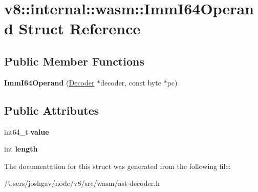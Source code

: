 \hypertarget{structv8_1_1internal_1_1wasm_1_1_imm_i64_operand}{}\section{v8\+:\+:internal\+:\+:wasm\+:\+:Imm\+I64\+Operand Struct Reference}
\label{structv8_1_1internal_1_1wasm_1_1_imm_i64_operand}
\subsection*{Public Member Functions}
\begin{DoxyCompactItemize}
\item 
{\bfseries Imm\+I64\+Operand} (\hyperlink{classv8_1_1internal_1_1wasm_1_1_decoder}{Decoder} $\ast$decoder, const byte $\ast$pc)\hypertarget{structv8_1_1internal_1_1wasm_1_1_imm_i64_operand_a7abe9e4010de0067efa098e71d176876}{}\label{structv8_1_1internal_1_1wasm_1_1_imm_i64_operand_a7abe9e4010de0067efa098e71d176876}

\end{DoxyCompactItemize}
\subsection*{Public Attributes}
\begin{DoxyCompactItemize}
\item 
int64\+\_\+t {\bfseries value}\hypertarget{structv8_1_1internal_1_1wasm_1_1_imm_i64_operand_a9caa003b689e87779330cc066e085a33}{}\label{structv8_1_1internal_1_1wasm_1_1_imm_i64_operand_a9caa003b689e87779330cc066e085a33}

\item 
int {\bfseries length}\hypertarget{structv8_1_1internal_1_1wasm_1_1_imm_i64_operand_a533bc39dd194f22d74b050714d2199cc}{}\label{structv8_1_1internal_1_1wasm_1_1_imm_i64_operand_a533bc39dd194f22d74b050714d2199cc}

\end{DoxyCompactItemize}


The documentation for this struct was generated from the following file\+:\begin{DoxyCompactItemize}
\item 
/\+Users/joshgav/node/v8/src/wasm/ast-\/decoder.\+h\end{DoxyCompactItemize}
